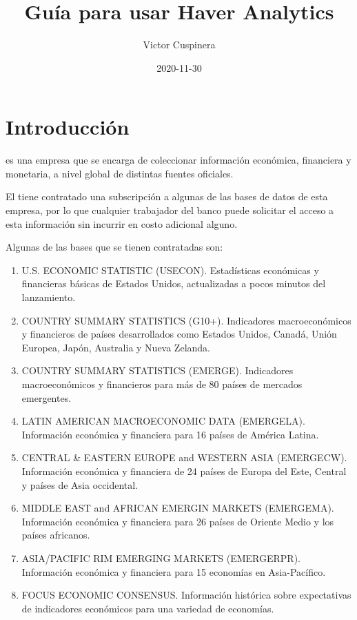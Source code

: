 \documentclass[
]{book}
\title{Guía para usar Haver Analytics}
\author{Victor Cuspinera}
\date{2020-11-30}
\begin{document}
\maketitle

{
\setcounter{tocdepth}{1}
\tableofcontents
}
\hypertarget{intro}{%
\chapter{Introducción}\label{intro}}

\citet{haver} es una empresa que se encarga de coleccionar información económica, financiera y monetaria, a nivel global de distintas fuentes oficiales.

El \citet{haver_banxico} tiene contratado una subscripción a algunas de las bases de datos de esta empresa, por lo que cualquier trabajador del banco puede solicitar el acceso a esta información sin incurrir en costo adicional alguno.

Algunas de las bases que se tienen contratadas son:

\begin{enumerate}
\def\labelenumi{\arabic{enumi}.}
\item
  U.S. ECONOMIC STATISTIC (USECON). Estadísticas económicas y financieras básicas de Estados Unidos, actualizadas a pocos minutos del lanzamiento.
\item
  COUNTRY SUMMARY STATISTICS (G10+). Indicadores macroeconómicos y financieros de países desarrollados como Estados Unidos, Canadá, Unión Europea, Japón, Australia y Nueva Zelanda.
\item
  COUNTRY SUMMARY STATISTICS (EMERGE). Indicadores macroeconómicos y financieros para más de 80 países de mercados emergentes.
\item
  LATIN AMERICAN MACROECONOMIC DATA (EMERGELA). Información económica y financiera para 16 países de América Latina.
\item
  CENTRAL \& EASTERN EUROPE and WESTERN ASIA (EMERGECW). Información económica y financiera de 24 países de Europa del Este, Central y países de Asia occidental.
\item
  MIDDLE EAST and AFRICAN EMERGIN MARKETS (EMERGEMA). Información económica y financiera para 26 países de Oriente Medio y los países africanos.
\item
  ASIA/PACIFIC RIM EMERGING MARKETS (EMERGERPR). Información económica y financiera para 15 economías en Asia-Pacífico.
\item
  FOCUS ECONOMIC CONSENSUS. Información histórica sobre expectativas de indicadores económicos para una variedad de economías.
\end{enumerate}
\end{document}
